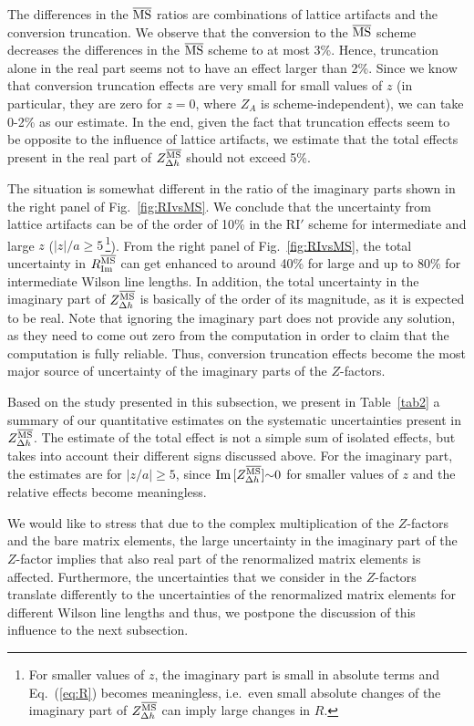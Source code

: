 \documentclass[12pt,tighten,nofootinbib,amssymb,floatfix]{article}
\newcommand{\MSb}{{\overline{\rm MS}}}
\renewcommand{\Im}{{\rm Im}\,}
\begin{document}
The differences in the $\MSb$ ratios are combinations of lattice artifacts and the conversion truncation.
We observe that the conversion to the $\MSb$ scheme decreases the differences in the $\MSb$ scheme to at most 3\%.
Hence, truncation alone in the real part seems not to have an effect larger than 2\%. Since we know that conversion 
truncation effects are very small for small values of $z$ (in particular, they are zero for $z{=}0$, where $Z_A$ 
is scheme-independent), we can take 0-2\% as our estimate. In the end, given the fact that truncation 
effects seem to be opposite to the influence of lattice artifacts, we estimate that the total effects present in the 
real part of $Z_{\Delta h}^\MSb$ should not exceed 5\%.

The situation is somewhat different in the ratio of the imaginary parts shown in the right panel of Fig.~\ref{fig:RIvsMS}. 
We conclude that the uncertainty from lattice artifacts can be of the order of 10\% in the RI$'$ scheme for intermediate 
and large $z$ ($|z|/a\geq5$\,\footnote{For smaller values of $z$, the imaginary part is small in absolute terms and 
Eq.~(\ref{eq:R})  becomes meaningless, i.e.\ even small absolute changes of the imaginary part of $Z_{\Delta h}^\MSb$ 
can imply large changes in $R$.}). From the right panel of Fig.~\ref{fig:RIvsMS}, the total uncertainty in 
$R_{\rm Im}^\MSb$ can get enhanced to around 40\% for large and up to 80\% for intermediate Wilson line lengths. 
In addition, the total uncertainty in the imaginary part of $Z_{\Delta h}^\MSb$ is basically of the order of its magnitude,
as it is expected to be real. Note that ignoring the imaginary part does not provide any solution, as  
 they need to come out zero from the computation in order to claim that the computation is fully reliable.
Thus, conversion truncation effects become the most major source of uncertainty of the imaginary parts of the $Z$-factors.

\bigskip
Based on the study presented in this subsection, we present in Table~\ref{tab2} a summary of our quantitative estimates on 
the systematic uncertainties present in $Z_{\Delta h}^\MSb$. The estimate of the total effect is not a simple sum of 
isolated effects, but takes into account their different signs discussed above. For the imaginary part, the estimates are for 
$|z/a|\geq5$, since $\Im[Z_{\Delta h}^\MSb]{\sim}0$ for smaller values of $z$ and the relative effects become meaningless.

We would like to stress that due to the complex multiplication of the $Z$-factors and the bare matrix elements,
the large uncertainty in the imaginary part of the $Z$-factor implies that also real part of the renormalized matrix 
elements is affected. Furthermore, the uncertainties that we consider in the $Z$-factors translate differently to the 
uncertainties of the renormalized matrix elements for different Wilson line lengths and thus, we postpone the discussion of this 
influence to the next subsection.
\end{document}
